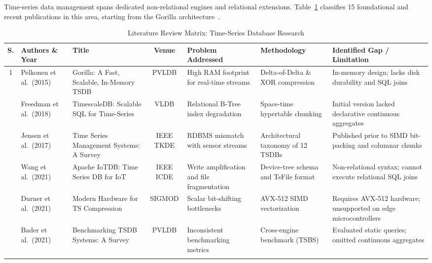 \documentclass[conference,a4paper]{IEEEtran}
\begin{document}
Time-series data management spans dedicated non-relational engines and relational extensions. Table~\ref{tab:literature_matrix} classifies 15 foundational and recent publications in this area, starting from the Gorilla architecture~\cite{pelkonen2015gorilla}.

\begin{table}[t]
\caption{Literature Review Matrix: Time-Series Database Research}
\label{tab:literature_matrix}
\centering
\footnotesize
\begin{tabularx}{\textwidth}{@{}c p{2.5cm} p{3.2cm} c p{2.8cm} p{2.5cm} X@{}}
\toprule
\textbf{S.} & \textbf{Authors \& Year} & \textbf{Title} & \textbf{Venue} & \textbf{Problem Addressed} & \textbf{Methodology} & \textbf{Identified Gap / Limitation} \\ \midrule
1 & Pelkonen et al.\ (2015)~\cite{pelkonen2015gorilla} & Gorilla: A Fast, Scalable, In-Memory TSDB & PVLDB & High RAM footprint for real-time streams & Delta-of-Delta \& XOR compression & In-memory design; lacks disk durability and SQL joins \\ \addlinespace[0.4ex]
2 & Freedman et al.\ (2018)~\cite{freedman2018timescaledb} & TimescaleDB: Scalable SQL for Time-Series & VLDB & Relational B-Tree index degradation & Space-time hypertable chunking & Initial version lacked declarative continuous aggregates \\ \addlinespace[0.4ex]
3 & Jensen et al.\ (2017)~\cite{jensen2017time} & Time Series Management Systems: A Survey & IEEE TKDE & RDBMS mismatch with sensor streams & Architectural taxonomy of 12 TSDBs & Published prior to SIMD bit-packing and columnar chunks \\ \addlinespace[0.4ex]
4 & Wang et al.\ (2021)~\cite{wang2021iotdb} & Apache IoTDB: Time Series DB for IoT & IEEE ICDE & Write amplification and file fragmentation & Device-tree schema and TsFile format & Non-relational syntax; cannot execute relational SQL joins \\ \addlinespace[0.4ex]
5 & Durner et al.\ (2021)~\cite{durner2021exploiting} & Modern Hardware for TS Compression & SIGMOD & Scalar bit-shifting bottlenecks & AVX-512 SIMD vectorization & Requires AVX-512 hardware; unsupported on edge microcontrollers \\ \addlinespace[0.4ex]
6 & Bader et al.\ (2021)~\cite{bader2021benchmarking} & Benchmarking TSDB Systems: A Survey & PVLDB & Inconsistent benchmarking metrics & Cross-engine benchmark (TSBS) & Evaluated static queries; omitted continuous aggregates \\ \addlinespace[0.4ex]

\end{tabularx}
\end{table}
\end{document}
